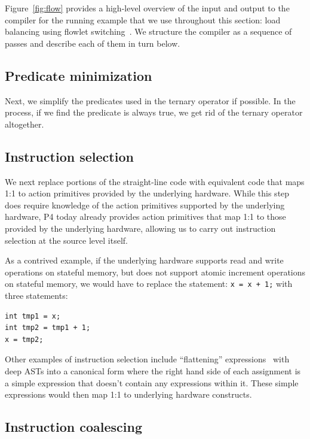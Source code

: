 Figure~\ref{fig:flow} provides a high-level overview of the input and output to
the compiler for the running example that we use throughout this section: load
balancing using flowlet switching~\cite{flowlets}.  We structure the compiler
as a sequence of passes and describe each of them in turn below. 

\subsection{Predicate minimization}
Next, we simplify the predicates used in the ternary operator if possible.  In
the process, if we find the predicate is always true, we get rid of the ternary
operator altogether.

\subsection{Instruction selection}
We next replace portions of the straight-line code with equivalent code that
maps 1:1 to action primitives provided by the underlying hardware. While this
step does require knowledge of the action primitives supported by the
underlying hardware, P4 today already provides action primitives that map
1:1 to those provided by the underlying hardware, allowing us to carry out
instruction selection at the source level itself.

As a contrived example, if the underlying hardware supports read and write
operations on stateful memory, but does not support atomic increment operations
on stateful memory, we would have to replace the statement: \texttt{x = x + 1;}
with three statements:
\begin{verbatim}
int tmp1 = x;
int tmp2 = tmp1 + 1;
x = tmp2;
\end{verbatim}

Other examples of instruction selection include ``flattening''
expressions~\cite{expression_flattening} with deep ASTs into a canonical form
where the right hand side of each assignment is a simple expression that
doesn't contain any expressions within it. These simple expressions would then
map 1:1 to underlying hardware constructs.

\subsection{Instruction coalescing}


